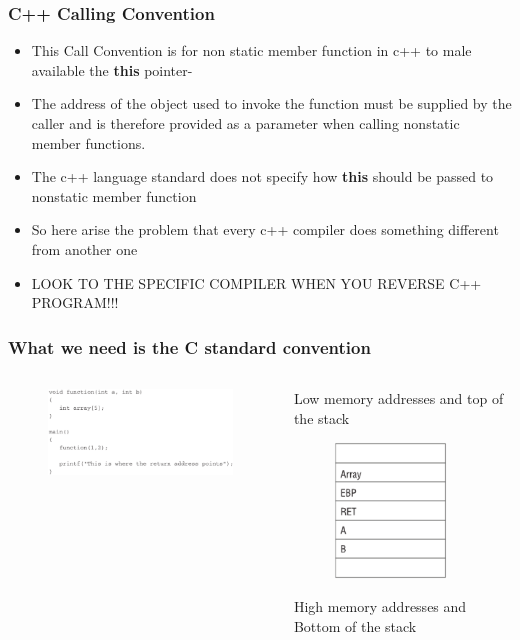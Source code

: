 \documentclass[]{beamer}
\begin{document}
		\begin{frame}
			\frametitle{C++ Calling Convention}
			\begin{itemize}
				\item{This Call Convention is for non static member function in c++ to male available the \textbf{this} pointer-}
				\item{The address of the object used to invoke the function must be supplied by the caller and is therefore provided as a parameter when calling nonstatic member functions.}
				\item{The c++ language standard does not specify how \textbf{this} should be passed to nonstatic member function}
				\item{So here arise the problem that every c++ compiler does something different from another one}
				\item{\color{red} LOOK TO THE SPECIFIC COMPILER WHEN YOU REVERSE C++ PROGRAM!!!}
			\end{itemize}
		\end{frame}

      \begin{frame}
        \frametitle{What we need is the C standard convention}
        \begin{columns}
            \begin{column}[left]{2.5in}
               \begin{figure}
                  \includegraphics[width=7.5cm]{images/c_fun_example.eps}
               \end{figure}
            \end{column}
            \begin{column}[right]{3in}
            {\centering\tiny Low memory addresses and top of the stack \par}
               \begin{figure}
                  \includegraphics[width=3cm]{images/stack_after_call.eps}
               
               \end{figure}
                 {\centering\tiny High memory addresses and Bottom of the stack\par}
            \end{column}
         \end{columns}
      \end{frame}
\end{document}
